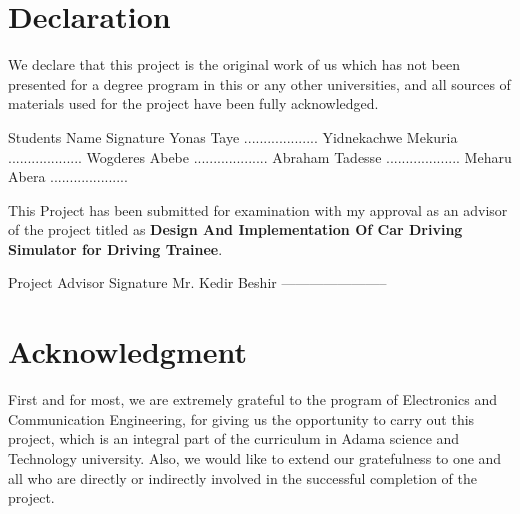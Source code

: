 \documentclass[12pt,a4paper]{article}
\begin{document}
\section*{Declaration}
We declare that this project is the original work of us which has not been presented for a degree program in this or any other universities, and all sources of materials used for the project have been fully acknowledged.

\vspace*{1.5cm}
   Students Name \hspace{7.5cm} Signature
   \newline
   \newline
 Yonas Taye \hspace{8.7cm}...................
\newline
 Yidnekachwe Mekuria \hspace{6.8cm}...................
\newline
 Wogderes Abebe \hspace{7.7cm}...................
\newline
 Abraham Tadesse \hspace{7.6cm}...................
\newline
 Meharu Abera \hspace{8.1cm}....................
\newline


This Project has been submitted for examination with my approval as an advisor of the project titled as
 \textbf{Design And Implementation Of Car Driving Simulator for Driving Trainee}.


\vspace*{1.5cm}
Project Advisor
\hspace*{7.5 cm}
Signature
\vspace*{0.5 cm}
\newline
Mr. Kedir Beshir
\hspace*{7cm}
----------------------- 
\pagebreak

\section*{Acknowledgment}

First and for most, we are extremely grateful to the program of Electronics and Communication Engineering, for
giving us the opportunity to carry out this project, which is an integral part of the curriculum in Adama science and Technology university. Also, we would like to extend our gratefulness to one and all who are directly or indirectly involved in the successful completion of the project. 
\newpage
\end{document}

